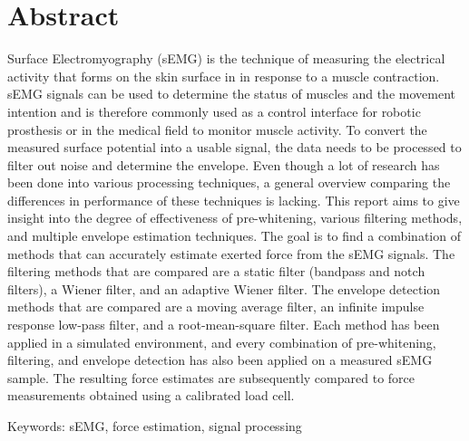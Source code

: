 \chapter*{Abstract}

Surface Electromyography (sEMG) is the technique of measuring the electrical activity that forms on the skin surface in in response to a muscle contraction. sEMG signals can be used to determine the status of muscles and the movement intention and is therefore commonly used as a control interface for robotic prosthesis or in the medical field to monitor muscle activity. To convert the measured surface potential into a usable signal, the data needs to be processed to filter out noise and determine the envelope. Even though a lot of research has been done into various processing techniques, a general overview comparing the differences in performance of these techniques is lacking. This report aims to give insight into the degree of effectiveness of pre-whitening, various filtering methods, and multiple envelope estimation techniques. The goal is to find a combination of methods that can accurately estimate exerted force from the sEMG signals. The filtering methods that are compared are a static filter (bandpass and notch filters), a Wiener filter, and an adaptive Wiener filter. The envelope detection methods that are compared are a moving average filter, an infinite impulse response low-pass filter, and a root-mean-square filter. Each method has been applied in a simulated environment, and every combination of pre-whitening, filtering, and envelope detection has also been applied on a measured sEMG sample. The resulting force estimates are subsequently compared to force measurements obtained using a calibrated load cell. 


Keywords: sEMG, force estimation, signal processing
